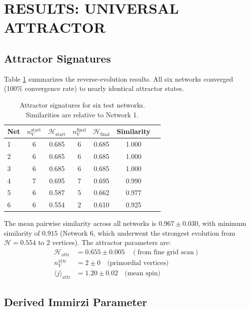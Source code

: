 \documentclass[twocolumn,aps,prd,showpacs,preprintnumbers,longbibliography]{revtex4-2}
\begin{document}
	\section{RESULTS: UNIVERSAL ATTRACTOR}
	
	\subsection{Attractor Signatures}
	
	Table \ref{tab:attractor} summarizes the reverse-evolution results. All six networks converged (100\% convergence rate) to nearly identical attractor states.
	
	\begin{table}[h]
		\centering
		\caption{Attractor signatures for six test networks. Similarities are relative to Network 1.}
		\begin{tabular}{lcccccc}
			\hline
			Net & $n_V^{\text{start}}$ & $\mathcal{H}_{\text{start}}$ & $n_V^{\text{final}}$ & $\mathcal{H}_{\text{final}}$ & Similarity \\
			\hline
			1 & 6 & 0.685 & 6 & 0.685 & 1.000 \\
			2 & 6 & 0.685 & 6 & 0.685 & 1.000 \\
			3 & 6 & 0.685 & 6 & 0.685 & 1.000 \\
			4 & 7 & 0.695 & 7 & 0.695 & 0.990 \\
			5 & 6 & 0.587 & 5 & 0.662 & 0.977 \\
			6 & 6 & 0.554 & 2 & 0.610 & 0.925 \\
			\hline
		\end{tabular}
		\label{tab:attractor}
	\end{table}
	
	The mean pairwise similarity across all networks is $0.967 \pm 0.030$, with minimum similarity of $0.915$ (Network 6, which underwent the strongest evolution from $\mathcal{H}=0.554$ to $2$ vertices). The attractor parameters are:
	\begin{align}
		\mathcal{H}_{\text{attr}} &= 0.655 \pm 0.005 \quad (\text{from fine grid scan}) \\
		n_V^{\text{attr}} &= 2 \pm 0 \quad \text{(primordial vertices)} \\
		\langle j \rangle_{\text{attr}} &= 1.20 \pm 0.02 \quad \text{(mean spin)}
	\end{align}
	
	\subsection{Derived Immirzi Parameter}
	
\end{document}
